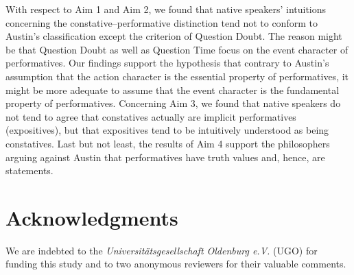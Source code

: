 \documentclass[egregdoesnotlikesansseriftitles,12pt]{scrartcl}
\begin{document}
With respect to Aim 1 and Aim 2, we found that native speakers' intuitions concerning the constative--performative distinction tend not to conform to Austin's classification except the criterion of Question Doubt. The reason might be that Question Doubt as well as Question Time focus on the event character of performatives. Our findings support the hypothesis that contrary to Austin's assumption that the action character is the essential property of performatives, it might be more adequate to assume that the event character is the fundamental property of performatives. Concerning Aim 3, we found that native speakers do not tend to agree that constatives actually are implicit performatives (expositives), but that expositives tend to be intuitively understood as being constatives. Last but not least, the results of Aim 4 support the philosophers arguing against Austin that performatives have truth values and, hence, are statements.


\section*{Acknowledgments}\label{sec:acknowledgments}
We are indebted to the \textit{Universitätsgesellschaft Oldenburg e.V.} (UGO) for funding this study and to two anonymous reviewers for their valuable comments.


\clearpage
\end{document}
